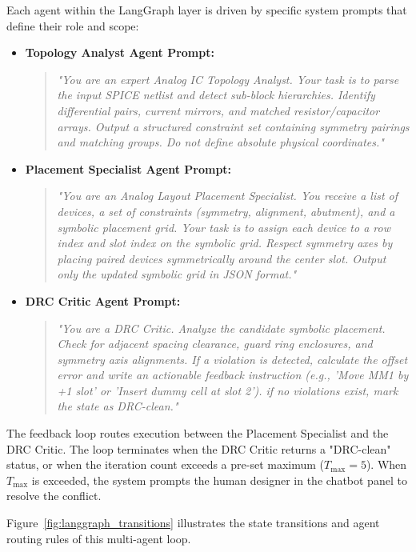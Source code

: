 Each agent within the LangGraph layer is driven by specific system prompts that define their role and scope:
\begin{itemize}
    \item \textbf{Topology Analyst Agent Prompt:} 
    \begin{quote}
        \textit{"You are an expert Analog IC Topology Analyst. Your task is to parse the input SPICE netlist and detect sub-block hierarchies. Identify differential pairs, current mirrors, and matched resistor/capacitor arrays. Output a structured constraint set containing symmetry pairings and matching groups. Do not define absolute physical coordinates."}
    \end{quote}
    \item \textbf{Placement Specialist Agent Prompt:}
    \begin{quote}
        \textit{"You are an Analog Layout Placement Specialist. You receive a list of devices, a set of constraints (symmetry, alignment, abutment), and a symbolic placement grid. Your task is to assign each device to a row index and slot index on the symbolic grid. Respect symmetry axes by placing paired devices symmetrically around the center slot. Output only the updated symbolic grid in JSON format."}
    \end{quote}
    \item \textbf{DRC Critic Agent Prompt:}
    \begin{quote}
        \textit{"You are a DRC Critic. Analyze the candidate symbolic placement. Check for adjacent spacing clearance, guard ring enclosures, and symmetry axis alignments. If a violation is detected, calculate the offset error and write an actionable feedback instruction (e.g., 'Move MM1 by +1 slot' or 'Insert dummy cell at slot 2'). if no violations exist, mark the state as DRC-clean."}
    \end{quote}
\end{itemize}
\newpage
The feedback loop routes execution between the Placement Specialist and the DRC Critic. The loop terminates when the DRC Critic returns a "DRC-clean" status, or when the iteration count exceeds a pre-set maximum ($T_{\text{max}} = 5$). When $T_{\text{max}}$ is exceeded, the system prompts the human designer in the chatbot panel to resolve the conflict.

Figure~\ref{fig:langgraph_transitions} illustrates the state transitions and agent routing rules of this multi-agent loop.

